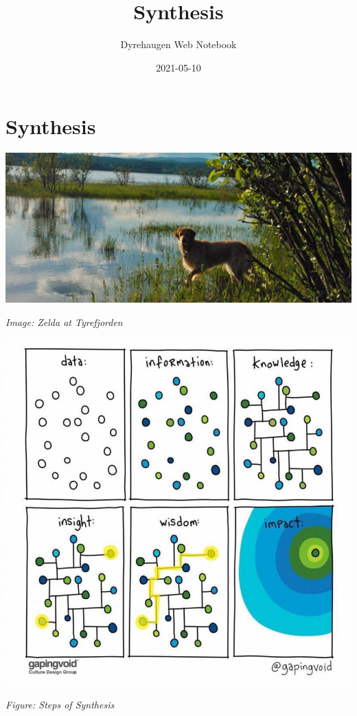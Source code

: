 \documentclass[
]{book}
\title{Synthesis}
\author{Dyrehaugen Web Notebook}
\date{2021-05-10}
\begin{document}
\maketitle

{
\setcounter{tocdepth}{1}
\tableofcontents
}
\hypertarget{synthesis}{%
\chapter{Synthesis}\label{synthesis}}

\includegraphics{fig/zelda.jpg}

\emph{Image: Zelda at Tyrefjorden}

\includegraphics{fig/information_knowledge_2.jpeg}

\emph{Figure: Steps of Synthesis}
\end{document}
